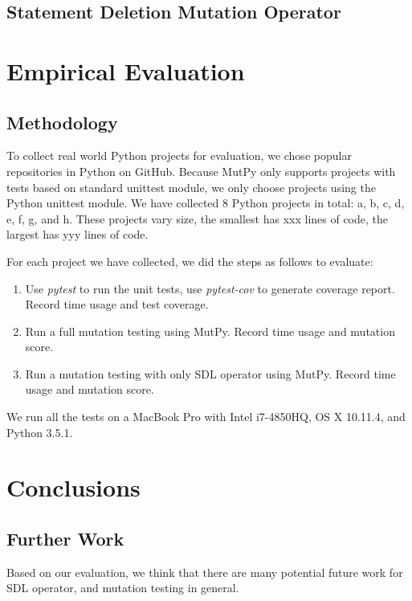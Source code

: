 \documentclass[12pt]{article}
\begin{document}
\subsection{Statement Deletion Mutation Operator}

\section{Empirical Evaluation}

\subsection{Methodology}

To collect real world Python projects for evaluation, we chose popular repositories in Python on GitHub. Because MutPy only supports projects with tests based on standard unittest module, we only choose projects using the Python unittest module. We have collected 8 Python projects in total: a, b, c, d, e, f, g, and h. These projects vary size, the smallest has xxx lines of code, the largest has yyy lines of code.

For each project we have collected, we did the steps as follows to evaluate:

\begin{enumerate}
  \item Use \emph{pytest} \cite{pytest} to run the unit tests, use \emph{pytest-cov} \cite{pytest-cov} to generate coverage report. Record time usage and test coverage.
  \item Run a full mutation testing using MutPy. Record time usage and mutation score.
  \item Run a mutation testing with only SDL operator using MutPy. Record time usage and mutation score.
\end{enumerate}

We run all the tests on a MacBook Pro with Intel i7-4850HQ, OS X 10.11.4, and Python 3.5.1.

\section{Conclusions}

\subsection{Further Work}

Based on our evaluation, we think that there are many potential future work for SDL operator, and mutation testing in general.
\end{document}

